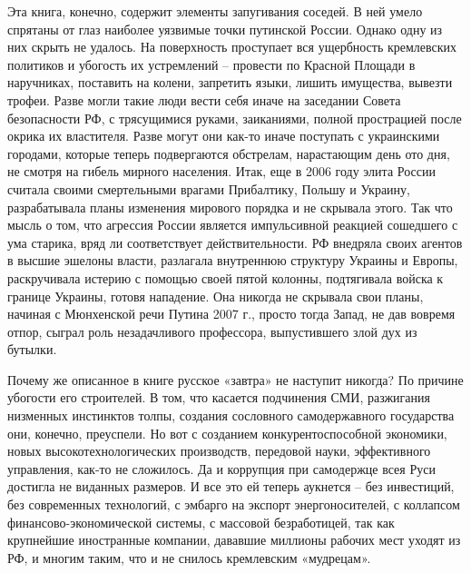 Эта книга, конечно, содержит элементы запугивания соседей. В ней умело спрятаны
от глаз наиболее уязвимые точки путинской России. Однако одну из них скрыть не
удалось. На поверхность проступает вся ущербность кремлевских политиков и
убогость их устремлений – провести по Красной Площади в наручниках, поставить
на колени, запретить языки, лишить имущества, вывезти трофеи. Разве могли такие
люди вести себя иначе на заседании Совета безопасности РФ, с трясущимися
руками, заиканиями, полной прострацией после окрика их властителя. Разве могут
они как-то иначе поступать с украинскими городами, которые теперь подвергаются
обстрелам, нарастающим день ото дня, не смотря на гибель мирного населения.
Итак, еще в 2006 году элита России считала своими смертельными врагами
Прибалтику, Польшу и Украину, разрабатывала планы изменения мирового порядка и
не скрывала этого. Так что мысль о том, что агрессия России является
импульсивной реакцией сошедшего с ума старика, вряд ли соответствует
действительности. РФ внедряла своих агентов в высшие эшелоны власти, разлагала
внутреннюю структуру Украины и Европы, раскручивала истерию с помощью своей
пятой колонны, подтягивала войска к границе Украины, готовя нападение. Она
никогда не скрывала свои планы, начиная с Мюнхенской речи Путина 2007 г.,
просто тогда Запад, не дав вовремя отпор, сыграл роль незадачливого профессора,
выпустившего злой дух из бутылки.

Почему же описанное в книге русское «завтра» не наступит никогда? По причине
убогости его строителей. В том, что касается подчинения СМИ, разжигания
низменных инстинктов толпы, создания сословного самодержавного государства они,
конечно, преуспели. Но вот с созданием конкурентоспособной экономики, новых
высокотехнологических производств, передовой науки, эффективного управления,
как-то не сложилось. Да и коррупция при самодержце всея Руси достигла не
виданных размеров. И все это ей теперь аукнется – без инвестиций, без
современных технологий, с эмбарго на экспорт энергоносителей, с коллапсом
финансово-экономической системы, с массовой безработицей, так как крупнейшие
иностранные компании, дававшие миллионы рабочих мест уходят из РФ, и многим
таким, что и не снилось кремлевским «мудрецам».


